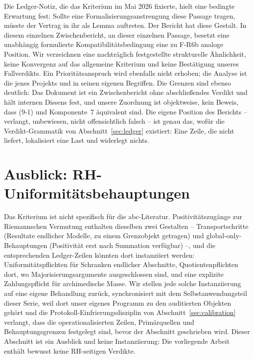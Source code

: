 \documentclass[11pt,a4paper]{article}
\begin{document}
Die Ledger-Notiz, die das Kriterium im Mai 2026 fixierte, hielt eine bedingte
Erwartung fest: Sollte eine Formalisierungsanstrengung diese Passage tragen,
müsste der Vertrag in ihr als Lemma auftreten. Der Bericht hat diese Gestalt.
In diesem einzelnen Zwischenbericht, an dieser einzelnen Passage, besetzt
eine unabhängig formulierte Kompatibilitätsbedingung eine zu F-R6b analoge
Position. Wir verzeichnen eine nachträglich festgestellte strukturelle
Ähnlichkeit, keine Konvergenz auf das allgemeine Kriterium und keine
Bestätigung unseres Fallverdikts. Ein Prioritätsanspruch wird ebenfalls nicht
erhoben; die Analyse ist die jenes Projekts und in seinen eigenen Begriffen.
Die Grenzen sind ebenso deutlich: Das Dokument ist ein Zwischenbericht ohne
abschließendes Verdikt und hält internen Dissens fest, und unsere Zuordnung
ist objektweise, kein Beweis, dass (9-1) und Komponente~7 äquivalent sind. Die
eigene Position des Berichts -- verlangt, unbewiesen, nicht offensichtlich
falsch -- ist genau das, wofür die Verdikt-Grammatik von
Abschnitt~\ref{sec:ledger} existiert: Eine Zeile, die nicht liefert,
lokalisiert eine Last und widerlegt nichts.

\section{Ausblick: RH-Uniformitätsbehauptungen}\label{sec:rh}

Das Kriterium ist nicht spezifisch für die abc-Literatur.
Positivitätszugänge zur Riemannschen Vermutung enthalten dieselben zwei
Gestalten -- Transportschritte (Resultate endlicher Modelle, zu einem
Grenzobjekt getragen) und global-only-Behauptungen (Positivität erst nach
Summation verfügbar) --, und die entsprechenden Ledger-Zeilen könnten dort
instanziiert werden: Uniformitätspflichten für Schranken endlicher
Abschnitte, Quotientenpflichten dort, wo Majorisierungsargumente
ausgeschlossen sind, und eine explizite Zahlungspflicht für archimedische
Masse. Wir stellen jede solche Instanziierung auf eine eigene Behandlung
zurück, synchronisiert mit dem Selbstanwendungsteil dieser Serie, weil dort
unser eigenes Programm zu den auditierten Objekten gehört und die
Protokoll-Einfrierungsdisziplin von Abschnitt~\ref{sec:calibration} verlangt,
dass die operationalisierten Zeilen, Primärquellen und Behauptungsgrenzen
festgelegt sind, bevor der Abschnitt geschrieben wird. Dieser Abschnitt ist
ein Ausblick und keine Instanziierung: Die vorliegende Arbeit enthält bewusst
keine RH-seitigen Verdikte.
\end{document}
